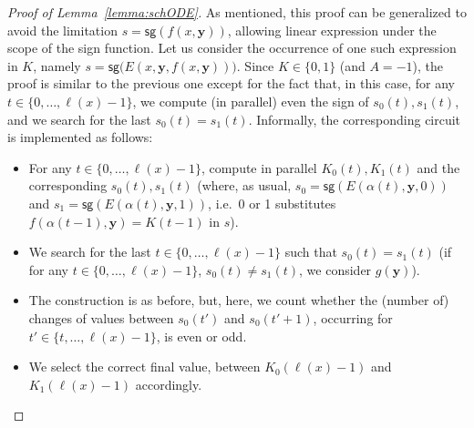 \documentclass[11pt, oneside]{article}
\newcommand{\longv}[1]{}
\newcommand{\fun}[1]{\mathsf{#1}}
\newcommand{\tu}[1]{\mathbf{#1}}
\theoremstyle{definition}
\newtheorem{remark}{Remark}
\newcommand{\ODEACC}{\ell\text{-ODE}_{\text{FACC[2]}}}
\newcommand{\schODE}{\ell\text{-b}_0\text{ODE}}
\begin{document}
\begin{toappendix}
\begin{proof}[Proof of Lemma~\ref{lemma:schODE}]
    As mentioned, this proof can be generalized to avoid the limitation $s=\fun{sg}(f(x,\tu y))$, allowing linear expression under the scope of the sign function.
    Let us consider the occurrence of one such expression in $K$, namely $s=\fun{sg}\big(E(x, \tu y, f(x,\tu y))\big)$.
    Since $K\in \{0,1\}$ (and $A=-1$), the proof is similar to the previous one except for the fact that, in this case, for any $t\in \{0, \dots, \ell(x)-1\}$, we compute (in parallel) even the sign of $s_0(t), s_1(t)$, and we search for the last $s_0(t)=s_1(t)$.
    Informally, the corresponding circuit is implemented as follows:
    \begin{itemize}
        \itemsep0em
        \item For any $t\in \{0, \dots, \ell(x)-1\}$, compute in parallel $K_0(t), K_1(t)$ and the corresponding $s_0(t), s_1(t)$ (where, as usual, $s_0=\fun{sg}(E(\alpha(t), \tu y,0))$ and $s_1=\fun{sg}(E(\alpha(t),\tu y,1))$, i.e.~0 or 1 substitutes $f(\alpha(t-1), \tu y) =K(t-1)$ in $s$).
        \item We search for the last $t\in \{0, \dots, \ell(x)-1\}$ such that $s_0(t)=s_1(t)$ (if for any $t\in \{0,\dots, \ell(x)-1\}$, $s_0(t)\neq s_1(t)$, we consider $g(\tu y)$).
        \item The construction is as before, but, here, we count whether the (number of) changes of values between $s_0(t')$ and $s_0(t'+1)$, occurring for $t'\in \{t, \dots, \ell(x)-1\}$, is even or odd.
        \item We select the correct final value, between $K_0(\ell(x)-1)$ and $K_1(\ell(x)-1)$ accordingly. 
    \end{itemize}
\end{proof}



\longv{
\marginpar{\textcolor{red}{A direct connection between $\ODEACC$ and $\schODE$ is missing}}
\begin{remark}[Relationship with $\ODEACC$ and $\schODE$]
    \textcolor{blue}{Both $\ODEACC$ and $\schODE$, restricted to occurrences of the form $s=\fun{sg}(f(x,\tu y))$, are special cases of the schema presented in Lemma~\ref{lemma:kkODE}.
    Indeed, any instance of $\ODEACC$
    can be seen as an instance of the given schema such that $k(x, \tu y)=2h(x, \tu y)$ and $k'(x, \tu y)=\frac{1}{2}$.
    On the other hand, $\schODE$ can be rewritten as an IVP such that $k(x, \tu y)= K_0(x)\times K_1(x)+ (1-K_0(x)) \times (1-K_1(x))$, while $k'(x, \tu y)$ is a convoluted expression involving $K_0(x)$ and $K_1(x)$ and described in Lemma~\ref{lemma:schODE}.}
\end{remark}
}



\end{toappendix}
\end{document}
